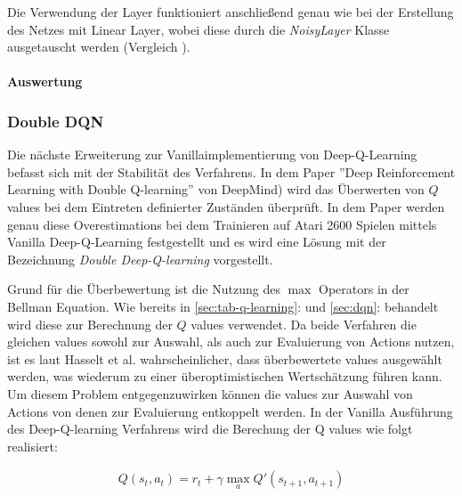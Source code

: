 \documentclass[11pt]{scrartcl}
\begin{document}
Die Verwendung der Layer funktioniert anschließend genau wie bei der Erstellung des Netzes mit
Linear Layer, wobei diese durch die \textit{NoisyLayer} Klasse ausgetauscht werden (Vergleich
). %

\paragraph*{Auswertung}
\noindent
\newline


\subsubsection{Double DQN} %
Die nächste Erweiterung zur Vanillaimplementierung von Deep-Q-Learning befasst sich mit der
Stabilität des Verfahrens. In dem Paper ''Deep Reinforcement Learning with Double Q-learning''
von DeepMind\cite{HGD2015}) wird das Überwerten von $Q$ values bei dem Eintreten definierter
Zuständen überprüft. In dem Paper werden genau diese Overestimations bei dem Trainieren auf
Atari 2600 Spielen mittels Vanilla Deep-Q-Learning festgestellt und es wird eine Lösung mit
der Bezeichnung \textit{Double Deep-Q-learning} vorgestellt. 

Grund für die Überbewertung ist die Nutzung des $\max$ Operators in der Bellman Equation.
Wie bereits in \autoref{sec:tab-q-learning}: und \autoref{sec:dqn}:
 behandelt wird diese zur Berechnung der $Q$ values verwendet. Da beide
Verfahren die gleichen values sowohl zur Auswahl, als auch zur Evaluierung von Actions nutzen,
ist es laut Hasselt et al.\cite[~S.2]{HGD2015} wahrscheinlicher, dass überbewertete values
ausgewählt werden, was wiederum zu einer überoptimistischen Wertschätzung führen kann. Um
diesem Problem entgegenzuwirken können die values zur Auswahl von Actions von denen zur
Evaluierung entkoppelt werden. In der Vanilla Ausführung des Deep-Q-learning Verfahrens
wird die Berechung der Q values wie folgt realisiert:

\begin{align}
Q(s_t, a_t) = r_t + \gamma\max_{a}Q'(s_{t+1},a_{t+1})
\label{aln:double-dqn-q-values}
\end{align}
\end{document}
